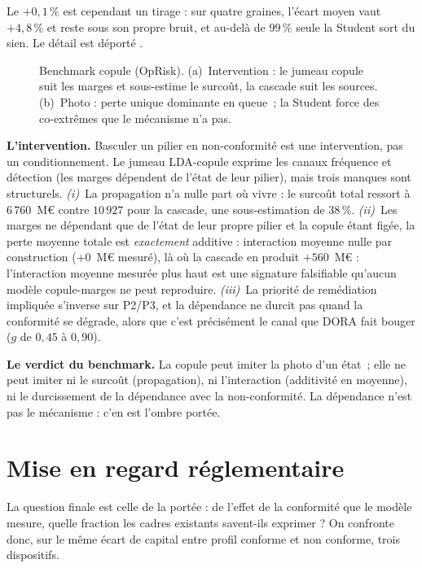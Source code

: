 Le $+0{,}1\,\%$ est cependant un tirage : sur quatre graines, l'écart moyen vaut $+4{,}8\,\%$
et reste sous son propre bruit, et au-delà de $99\,\%$ seule la Student sort du sien. Le détail
est déporté \matcomp.

\begin{figure}[H]\centering
{}
\caption{Benchmark copule (OpRisk). (a)~Intervention : le jumeau copule suit les marges et
sous-estime le surcoût, la cascade suit les sources. (b)~Photo : perte unique dominante en
queue~; la Student force des co-extrêmes que le mécanisme n'a pas.}
\label{fig:benchmark}
\end{figure}

\textbf{L'intervention.} Basculer un pilier en non-conformité est une intervention, pas un
conditionnement. Le jumeau LDA-copule exprime les canaux fréquence et détection (les marges
dépendent de l'état de leur pilier), mais trois manques sont structurels.
\emph{(i)}~La propagation n'a nulle part où vivre : le surcoût total ressort à
$6\,760$~M\euro{} contre $10\,927$ pour la cascade, une sous-estimation de $38\,\%$.
\emph{(ii)}~Les marges ne dépendant que de l'état de leur propre pilier et la copule étant
figée, la perte moyenne totale est \emph{exactement} additive : interaction moyenne nulle
par construction ($+0$~M\euro{} mesuré), là où la cascade en produit $+560$~M\euro{} :
l'interaction moyenne mesurée plus haut est une signature falsifiable qu'aucun modèle
copule-marges ne peut reproduire. \emph{(iii)}~La priorité de remédiation impliquée
s'inverse sur P2/P3, et la dépendance ne durcit pas quand la conformité se dégrade, alors
que c'est précisément le canal que DORA fait bouger ($g$ de $0{,}45$ à $0{,}90$).

\begin{cle}
\textbf{Le verdict du benchmark.} La copule peut imiter la photo d'un état~; elle ne
peut imiter ni le surcoût (propagation), ni l'interaction (additivité en moyenne), ni le
durcissement de la dépendance avec la non-conformité. La dépendance n'est pas le
mécanisme : c'en est l'ombre portée.
\end{cle}

\section{Mise en regard réglementaire}
\label{sec:regard-reglementaire}

La question finale est celle de la portée : de l'effet de la conformité que le modèle
mesure, quelle fraction les cadres existants savent-ils exprimer ? On confronte donc, sur
le même écart de capital entre profil conforme et non conforme, trois dispositifs.

